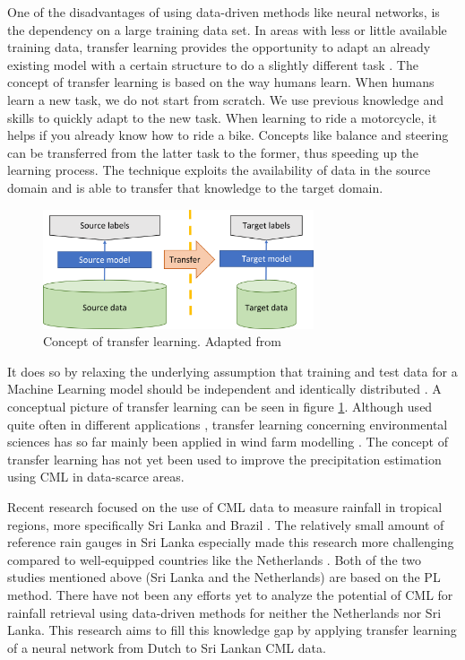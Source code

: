 \documentclass[twocolumn, 10pt, a4paper]{article}
\begin{document}
	One of the disadvantages of using data-driven methods like neural networks, is the dependency on a large training data set. In areas with less or little available training data, transfer learning provides the opportunity to adapt an already existing model with a certain structure to do a slightly different task \cite{TanYear}. The concept of transfer learning is based on the way humans learn. When humans learn a new task, we do not start from scratch. We use previous knowledge and skills to quickly adapt to the new task. When learning to ride a motorcycle, it helps if you already know how to ride a bike. Concepts like balance and steering can be transferred from the latter task to the former, thus speeding up the learning process. 
	The technique exploits the availability of data in the source domain and is able to transfer that knowledge to the target domain.
	\begin{figure}[t]
		\includegraphics[width=8cm]{Transfer_learning_concept}
		\caption{Concept of transfer learning. Adapted from \protect\cite{Sarkar2018} }
		\label{fig:transferconcept}
	\end{figure} 
	It does so by relaxing the underlying assumption that training and test data for a Machine Learning model should be independent and identically distributed \cite{Weiss2016}. A conceptual picture of transfer learning can be seen in figure \ref{fig:transferconcept}. Although used quite often in different applications \cite{Zhuang2021}, transfer learning concerning environmental sciences has so far mainly been applied in wind farm modelling . The concept of transfer learning has not yet been used to improve the precipitation estimation using CML in data-scarce areas. 
		
	Recent research focused on the use of CML data to measure rainfall in tropical regions, more specifically Sri Lanka  and Brazil . The relatively small amount of reference rain gauges in Sri Lanka especially made this research more challenging compared to well-equipped countries like the Netherlands . Both of the two studies mentioned above (Sri Lanka and the Netherlands) are based on the PL method. There have not been any efforts yet to analyze the potential of CML for rainfall retrieval using data-driven methods for neither the Netherlands nor Sri Lanka. This research aims to fill this knowledge gap by applying transfer learning of a neural network from Dutch to Sri Lankan CML data.
\end{document}
